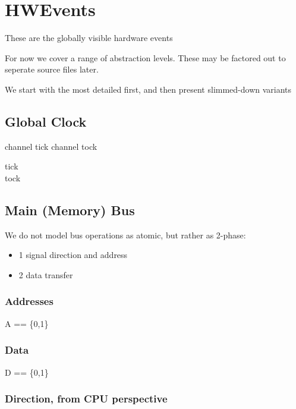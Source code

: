 
\section{HWEvents}
 These are the globally visible hardware events

 For now we cover a range of abstraction levels.
 These may be factored out to seperate source files later.

 We start with the most detailed first,
 and then present slimmed-down variants



\subsection{Global Clock}

\begin{cspm}
channel tick
channel tock
\end{cspm}
\begin{circus}
\circchannel tick\\  %
\circchannel tock  %
\end{circus}

\subsection{Main (Memory) Bus}

  We do not model bus operations as atomic, but rather as 2-phase:
	\begin{itemize}
   \item{1} signal direction and address
   \item{2} data transfer
	 \end{itemize}

\subsubsection{Addresses}

\begin{circus}
A == \{0,1\}
\end{circus}

\subsubsection{Data}

\begin{circus}
D == \{0,1\}
\end{circus}

\subsubsection{Direction, from CPU perspective}

